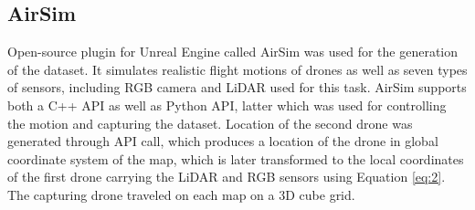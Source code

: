 \documentclass[twoside]{ctuthesis}
\theoremstyle{plain}
\theoremstyle{definition}
\theoremstyle{note}
\begin{document}
\subsection{AirSim}
Open-source plugin for Unreal Engine called AirSim was used for the generation of the dataset. It simulates realistic flight motions of drones as well as seven types of sensors, including RGB camera and LiDAR used for this task. AirSim supports both a C++ API as well as Python API, latter which was used for controlling the motion and capturing the dataset. Location of the second drone was generated through API call, which produces a location of the drone in global coordinate system of the map, which is later transformed to the local coordinates of the first drone carrying the LiDAR and RGB sensors using Equation \ref{eq:2}. The capturing drone traveled on each map on a 3D cube grid.
\end{document}
